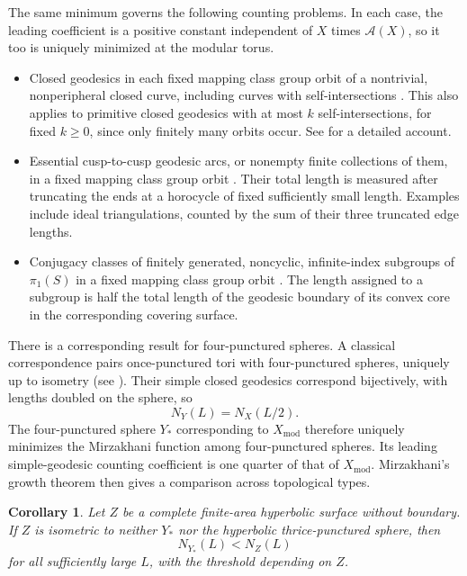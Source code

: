 \documentclass[10pt,twoside]{article}
\theoremstyle{plain}
\newtheorem{corollary}[theorem]{Corollary}
\theoremstyle{definition}
\theoremstyle{remark}
\newcommand{\A}{\mathcal A}
\newcommand{\Xmod}{X_{\mathrm{mod}}}
\begin{document}
The same minimum governs the following counting problems. In each
case, the leading coefficient is a positive constant independent
of $X$ times $\A(X)$, so it too is uniquely minimized at the
modular torus.
\begin{itemize}
\item
Closed geodesics in each fixed mapping class group orbit of a
nontrivial, nonperipheral closed curve, including curves with
self-intersections \cite{ErlandssonSouto,MirzakhaniOrbits}.
This also applies to primitive closed geodesics with at most
$k$ self-intersections, for fixed $k\geq0$, since only finitely
many orbits occur. See \cite{ErlandssonSoutoBook} for a detailed account.

\item
Essential cusp-to-cusp geodesic arcs, or nonempty finite collections
of them, in a fixed mapping class group orbit
\cite{Bell,Trin}.
Their total length is measured after truncating the ends at a
horocycle of fixed sufficiently small length.
Examples include ideal triangulations, counted by the sum of
their three truncated edge lengths.

\item
Conjugacy classes of finitely generated, noncyclic, infinite-index
subgroups of $\pi_1(S)$ in a fixed mapping class group orbit
\cite{Sasaki}.
The length assigned to a subgroup is half the total length
of the geodesic boundary of its convex core in the corresponding
covering surface.
\end{itemize}

There is a corresponding result for four-punctured spheres.
A classical correspondence pairs once-punctured tori with
four-punctured spheres, uniquely up to isometry
(see \cite{HuTan}).
Their simple closed geodesics correspond bijectively,
with lengths doubled on the sphere, so
$$
N_Y(L)=N_X(L/2).
$$
The four-punctured sphere $Y_*$ corresponding to $\Xmod$ therefore uniquely
minimizes the Mirzakhani function among four-punctured spheres.
Its leading simple-geodesic counting coefficient is one quarter
of that of $\Xmod$. Mirzakhani's growth theorem
\cite{MirzakhaniGrowth} then gives a comparison across topological
types.

\begin{corollary}
\label{cor:fewest-simple-geodesics}
Let $Z$ be a complete finite-area hyperbolic surface without boundary.
If $Z$ is isometric to neither $Y_*$ nor the hyperbolic
thrice-punctured sphere, then
$$
N_{Y_*}(L)<N_Z(L)
$$
for all sufficiently large $L$, with the threshold depending
on $Z$.
\end{corollary}
\end{document}
